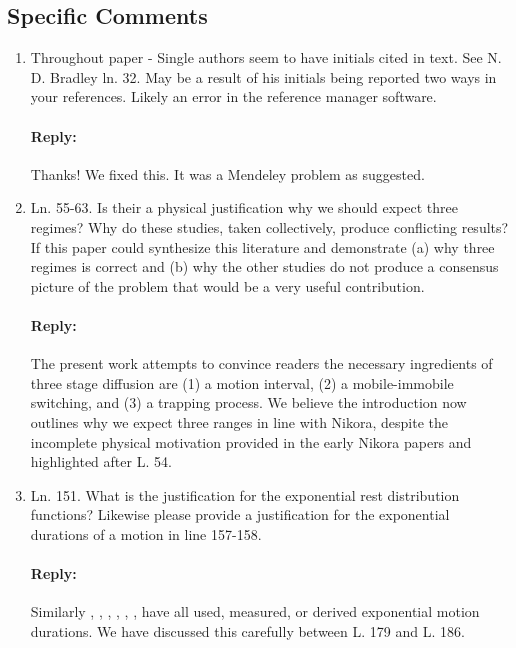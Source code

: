 \documentclass[11pt]{article}
\begin{document}
\subsection*{Specific Comments}
\begin{enumerate}

\item 
Throughout paper - Single authors seem to have initials cited in text. See N. D. Bradley ln. 32. May be a result of his initials being reported two ways in your references. Likely an error in the reference manager software.

\paragraph{Reply:}
Thanks! We fixed this. It was a Mendeley problem as suggested.

\item 
Ln. 55-63. Is their a physical justification why we should expect three regimes? Why do these studies, taken collectively, produce conflicting results? If this paper could synthesize this literature and demonstrate (a) why three regimes is correct and (b) why the other studies do not produce a consensus picture of the problem that would be a very useful contribution.

\paragraph{Reply:}
The present work attempts to convince readers the necessary ingredients of three stage diffusion are (1) a motion interval, (2) a mobile-immobile switching, and (3) a trapping process. We believe the introduction now outlines why we expect three ranges in line with Nikora, despite the incomplete physical motivation provided in the early Nikora papers and highlighted after L. 54. 

\item 
Ln. 151. What is the justification for the exponential rest distribution functions? Likewise please provide a justification for the exponential durations of a motion in line 157-158.

\paragraph{Reply:}
 

Similarly \citet{Furbish2016}, \citet{Furbish2017}, \citet{Ancey2006}, \citet{Ancey2008}, \citet{Wu2019}, \citet{Lisle1998}, \citet{Lajeunesse2018} have all used, measured, or derived exponential motion durations.
We have discussed this carefully between L. 179 and L. 186. 



\end{enumerate}
\end{document}
